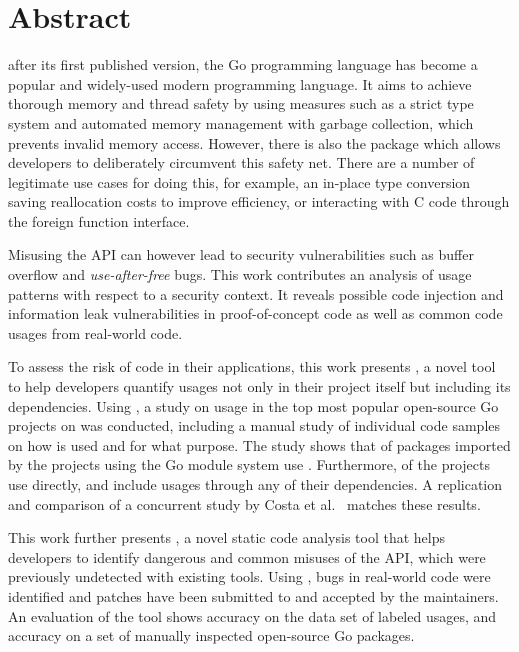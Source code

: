 \chapter*{Abstract}

 after its first published version, the Go programming language has become a popular and
widely-used modern programming language.
It aims to achieve thorough memory and thread safety by using measures such as a strict type system and automated memory
management with garbage collection, which prevents invalid memory access.
However, there is also the \unsafe{} package which allows developers to deliberately circumvent this safety net.
There are a number of legitimate use cases for doing this, for example, an in-place type conversion saving reallocation
costs to improve efficiency, or interacting with C code through the foreign function interface.

Misusing the \unsafe{} API can however lead to security vulnerabilities such as buffer overflow and
\textit{use-after-free} bugs.
This work contributes an analysis of \unsafe{} usage patterns with respect to a security context.
It reveals possible code injection and information leak vulnerabilities in proof-of-concept code as well as common code
usages from real-world code.

To assess the risk of \unsafe{} code in their applications, this work presents \toolGeiger{}, a novel tool to help
developers quantify \unsafe{} usages not only in their project itself but including its dependencies.
Using \toolGeiger{}, a study on \unsafe{} usage in the top \projsTotal{} most popular open-source Go projects on
\github{} was conducted, including a manual study of \numberLabeledCodeSnippets{} individual code samples on how
\unsafe{} is used and for what purpose.
The study shows that \percentageUnsafePackages{} of packages imported by the projects using the Go module system use
\unsafe{}.
Furthermore, \percentageUnsafeProjects{} of the projects use \unsafe{} directly, and
\percentageUnsafeTransitiveWithDependencies{} include \unsafe{} usages through any of their dependencies.
A replication and comparison of a concurrent study by Costa et al.~\cite{costa2020} matches these results.

This work further presents \toolSafer{}, a novel static code analysis tool that helps developers to identify
 dangerous and common misuses of the \unsafe{} API, which were previously undetected with existing tools.
Using \toolSafer{}, \numberBugsFixed{} bugs in real-world code were identified and patches have been submitted to and
accepted by the maintainers.
An evaluation of the tool shows \goSaferEvaluationDatasetGosaferAccuracy{} accuracy on the data set of labeled \unsafe{}
usages, and \goSaferEvaluationPackagesGosaferAccuracy{} accuracy on a set of manually inspected open-source Go packages.


